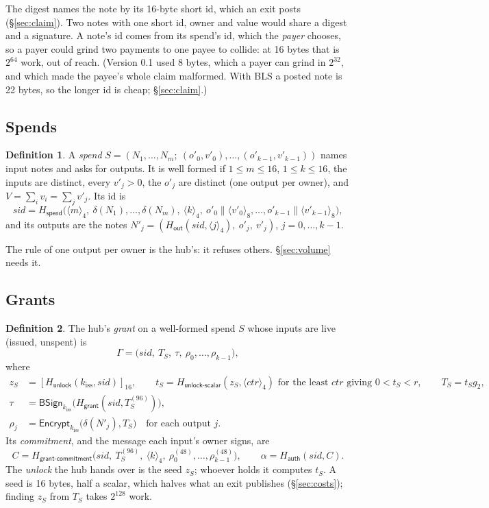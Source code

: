 \documentclass[11pt]{article}
\theoremstyle{plain}
\theoremstyle{definition}
\newtheorem{definition}{Definition}
\newcommand{\be}[2]{\langle #1\rangle_{#2}}
\newcommand{\pre}[2]{[#1]_{#2}}
\newcommand{\Ht}[1]{H_{\textsf{#1}}}
\newcommand{\kiss}{k_{\mathrm{iss}}}
\newcommand{\sid}{\mathit{sid}}
\newcommand{\BSign}{\mathsf{BSign}}
\newcommand{\Enc}{\mathsf{Encrypt}}
\begin{document}
The digest names the note by its 16-byte short id, which an exit posts
(\S\ref{sec:claim}). Two notes with one short id, owner and value would
share a digest and a signature. A note's id comes from its spend's id,
which the \emph{payer} chooses, so a payer could grind two payments to
one payee to collide: at 16 bytes that is $2^{64}$ work, out of reach.
(Version 0.1 used 8 bytes, which a payer can grind in $2^{32}$, and
which made the payee's whole claim malformed. With BLS a posted note is
22 bytes, so the longer id is cheap; \S\ref{sec:claim}.)

\subsection{Spends}

\begin{definition}
A \emph{spend} $S = (N_1, \dots, N_m;\ (o'_0, v'_0), \dots, (o'_{k-1},
v'_{k-1}))$ names input notes and asks for outputs. It is well formed if
$1 \le m \le 16$, $1 \le k \le 16$, the inputs are distinct, every
$v'_j > 0$, the $o'_j$ are distinct (one output per owner), and $V =
\sum_i v_i = \sum_j v'_j$. Its id is
\[
  \sid = \Ht{spend}\big(\be{m}{4},\ \delta(N_1), \dots, \delta(N_m),\
  \be{k}{4},\ o'_0 \| \be{v'_0}{8}, \dots, o'_{k-1} \| \be{v'_{k-1}}{8}\big),
\]
and its outputs are the notes $N'_j = (\Ht{out}(\sid, \be{j}{4}),\ o'_j,\
v'_j)$, $j = 0, \dots, k-1$.
\end{definition}

The rule of one output per owner is the hub's: it refuses others.
\S\ref{sec:volume} needs it.

\subsection{Grants}\label{sec:grant}

\begin{definition}
The hub's \emph{grant} on a well-formed spend $S$ whose inputs are live
(issued, unspent) is
\[
  \Gamma = \big(\sid,\ T_S,\ \tau,\ \rho_0, \dots, \rho_{k-1}\big),
\]
where
\begin{align*}
  z_S &= \pre{\Ht{unlock}(\kiss, \sid)}{16},\qquad
  t_S = \Ht{unlock-scalar}(z_S, \be{\mathit{ctr}}{4}) \text{ for the least
  } \mathit{ctr} \text{ giving } 0 < t_S < r,\qquad T_S = t_S g_2,\\
  \tau &= \BSign_{\kiss}\big(\Ht{grant}(\sid, T_S^{(96)})\big),\\
  \rho_j &= \Enc_{\kiss}\big(\delta(N'_j), T_S\big)\quad \text{for each output } j.
\end{align*}
Its \emph{commitment}, and the message each input's owner signs, are
\[
  C = \Ht{grant-commitment}\big(\sid,\ T_S^{(96)},\ \be{k}{4},\
  \rho_0^{(48)}, \dots, \rho_{k-1}^{(48)}\big),\qquad
  \alpha = \Ht{auth}(\sid, C).
\]
The \emph{unlock} the hub hands over is the seed $z_S$; whoever holds it
computes $t_S$. A seed is 16 bytes, half a scalar, which halves what an
exit publishes (\S\ref{sec:costs}); finding $z_S$ from $T_S$ takes
$2^{128}$ work.
\end{definition}
\end{document}
